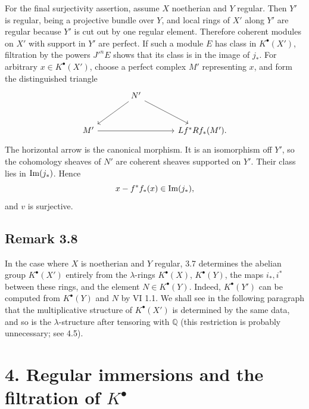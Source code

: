 \documentclass[11pt]{article}
\newcommand{\Fil}{\operatorname{Fil}}
\providecommand{\codim}{\operatorname{codim}}
\providecommand{\Q}{\mathbb Q}
\providecommand{\codim}{\operatorname{codim}}
\providecommand{\rank}{\operatorname{rank}}
\providecommand{\cO}{\mathcal O}
\begin{document}
For the final surjectivity assertion, assume \(X\) noetherian and \(Y\) regular. Then \(Y'\) is regular, being a projective bundle over \(Y\), and local rings of \(X'\) along \(Y'\) are regular because \(Y'\) is cut out by one regular element. Therefore coherent modules on \(X'\) with support in \(Y'\) are perfect. If such a module \(E\) has class in \(K^\bullet(X')\), filtration by the powers \(J'^nE\) shows that its class is in the image of \(j_*\). For arbitrary \(x\in K^\bullet(X')\), choose a perfect complex \(M'\) representing \(x\), and form the distinguished triangle
\[
\begin{tikzcd}[column sep=large,row sep=large]
& N' \arrow[dl] \arrow[dr] &\\
M' \arrow[rr] && Lf^*Rf_*(M').
\end{tikzcd}
\]
The horizontal arrow is the canonical morphism. It is an isomorphism off \(Y'\), so the cohomology sheaves of \(N'\) are coherent sheaves supported on \(Y'\). Their class lies in \(\Imf(j_*)\). Hence
\[
x-f^*f_*(x)\in\Imf(j_*),
\]
and \(v\) is surjective.



\providecommand{\Q}{\mathbb Q}
\providecommand{\bfP}{\mathbf P}
\providecommand{\gr}{\operatorname{gr}}
\providecommand{\Id}{\operatorname{Id}}
\providecommand{\Fil}{\operatorname{Fil}}
\providecommand{\Imf}{\operatorname{Im}}
\providecommand{\rank}{\operatorname{rank}}
\providecommand{\codim}{\operatorname{codim}}
\providecommand{\cJ}{\mathcal J}
\providecommand{\cI}{\mathcal I}
\providecommand{\cN}{\mathcal N}
\providecommand{\cE}{\mathcal E}
\providecommand{\cO}{\mathcal O}


\subsection*{Remark 3.8}

In the case where \(X\) is noetherian and \(Y\) regular, 3.7 determines the abelian group \(K^\bullet(X')\) entirely from the \(\lambda\)-rings \(K^\bullet(X)\), \(K^\bullet(Y)\), the maps \(i_*,i^*\) between these rings, and the element \(N\in K^\bullet(Y)\). Indeed, \(K^\bullet(Y')\) can be computed from \(K^\bullet(Y)\) and \(N\) by VI 1.1. We shall see in the following paragraph that the multiplicative structure of \(K^\bullet(X')\) is determined by the same data, and so is the \(\lambda\)-structure after tensoring with \(\mathbb Q\) (this restriction is probably unnecessary; see 4.5).

\section*{4. Regular immersions and the filtration of \(K^\bullet\)}
\end{document}
